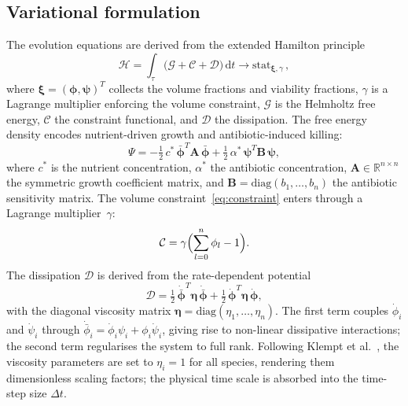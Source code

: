 \documentclass[11pt,a4paper]{article}
\newcommand{\bphi}{\boldsymbol{\phi}}
\newcommand{\bpsi}{\boldsymbol{\psi}}
\newcommand{\Real}{\mathbb{R}}
\begin{document}
\subsection{Variational formulation}

The evolution equations are derived from the extended Hamilton principle~\cite{JunkerBalzani2021ExtendedHamilton, JunkerBodeHackl2025Holistic}
\begin{equation}
\mathcal{H} = \int_\tau \bigl(\mathcal{G} + \mathcal{C} + \mathcal{D}\bigr)\,\mathrm{d}t \to \mathrm{stat}_{\boldsymbol{\xi},\gamma}\,,
\label{eq:hamilton}
\end{equation}
where $\boldsymbol{\xi}=(\boldsymbol{\phi},\boldsymbol{\psi})^T$ collects the volume fractions and viability fractions, $\gamma$ is a Lagrange multiplier enforcing the volume constraint, $\mathcal{G}$ is the Helmholtz free energy, $\mathcal{C}$ the constraint functional, and $\mathcal{D}$ the dissipation.
The free energy density encodes nutrient-driven growth and antibiotic-induced killing:
\begin{equation}
\Psi = -\tfrac{1}{2}\,c^*\,\bar{\bphi}^T \mathbf{A}\,\bar{\bphi}
      + \tfrac{1}{2}\,\alpha^*\,\bpsi^T \mathbf{B}\,\bpsi,
\label{eq:psi}
\end{equation}
where $c^*$ is the nutrient concentration, $\alpha^*$ the antibiotic concentration, $\mathbf{A}\in\Real^{n\times n}$ the symmetric growth coefficient matrix, and $\mathbf{B}=\mathrm{diag}(b_1,\dots,b_n)$ the antibiotic sensitivity matrix.
The volume constraint~\eqref{eq:constraint} enters through a Lagrange multiplier~$\gamma$:
\begin{equation}
\mathcal{C} = \gamma\Bigl(\sum_{l=0}^{n}\phi_l - 1\Bigr).
\label{eq:cfunc}
\end{equation}
The dissipation $\mathcal{D}$ is derived from the rate-dependent potential~\cite{Klempt2025ContinuumBiofilm}
\begin{equation}
\mathcal{D} = \tfrac{1}{2}\,\dot{\bar{\bphi}}^T\boldsymbol{\eta}\,\dot{\bar{\bphi}}
          + \tfrac{1}{2}\,\dot{\bphi}^T\boldsymbol{\eta}\,\dot{\bphi},
\label{eq:dissipation}
\end{equation}
with the diagonal viscosity matrix $\boldsymbol{\eta}=\mathrm{diag}(\eta_1,\dots,\eta_n)$.
The first term couples $\dot\phi_i$ and $\dot\psi_i$ through $\dot{\bar\phi}_i = \dot\phi_i\psi_i + \phi_i\dot\psi_i$, giving rise to non-linear dissipative interactions; the second term regularises the system to full rank.
Following Klempt et al.~\cite{Klempt2025ContinuumBiofilm}, the viscosity parameters are set to $\eta_i=1$ for all species, rendering them dimensionless scaling factors; the physical time scale is absorbed into the time-step size $\Delta t$.
\end{document}
